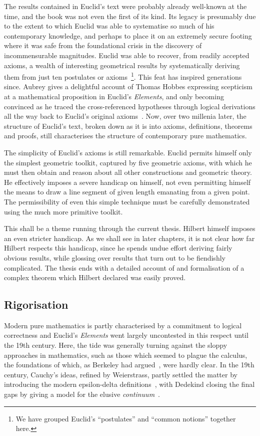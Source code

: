 The results contained in Euclid's text were probably already well-known at the time, and the book was not even the first of its kind. Its legacy is presumably due to the extent to which Euclid was able to systematise so much of his contemporary knowledge, and perhaps to place it on an extremely secure footing where it was safe from the foundational crisis in the discovery of incommensurable magnitudes. Euclid was able to recover, from readily accepted axioms, a wealth of interesting geometrical results by systematically deriving them from just ten postulates or axioms~\footnote{We have grouped Euclid's ``postulates'' and ``common notions'' together here.}. This feat has inspired generations since. Aubrey gives a delightful account of Thomas Hobbes expressing scepticism at a mathematical proposition in Euclid's \emph{Elements}, and only becoming convinced as he traced the cross-referenced hypotheses through logical derivations all the way back to Euclid's original axioms~\cite{ElementaryGeometryRoe}. Now, over two millenia later, the structure of Euclid's text, broken down as it is into axioms, definitions, theorems and proofs, still characterises the structure of contemporary pure mathematics.

The simplicity of Euclid's axioms is still remarkable. Euclid permits himself only the simplest geometric toolkit, captured by five geometric axioms, with which he must then obtain and reason about all other constructions and geometric theory. He effectively imposes a severe handicap on himself, not even permitting himself the means to draw a line segment of given length emanating from a given point. The permissibility of even this simple technique must be carefully demonstrated using the much more primitive toolkit.

This shall be a theme running through the current thesis. Hilbert himself imposes an even stricter handicap. As we shall see in later chapters, it is not clear how far Hilbert respects this handicap, since he spends undue effort deriving fairly obvious results, while glossing over results that turn out to be fiendishly complicated. The thesis ends with a detailed account of and formalisation of a complex theorem which Hilbert declared was easily proved.

\subsection{Rigorisation}
Modern pure mathematics is partly characterised by a commitment to logical correctness and Euclid's \emph{Elements} went largely uncontested in this respect until the 19th century. Here, the tide was generally turning against the sloppy approaches in mathematics, such as those which seemed to plague the calculus, the foundations of which, as Berkeley had argued~\cite{BerkeleyNewton}, were hardly clear. In the 19th century, Cauchy's ideas, refined by Weierstrass, partly settled the matter by introducing the modern epsilon-delta definitions~\cite{RigorousCalculus}, with Dedekind closing the final gaps by giving a model for the elusive \emph{continuum}~\cite{DedekindsCuts}. 

